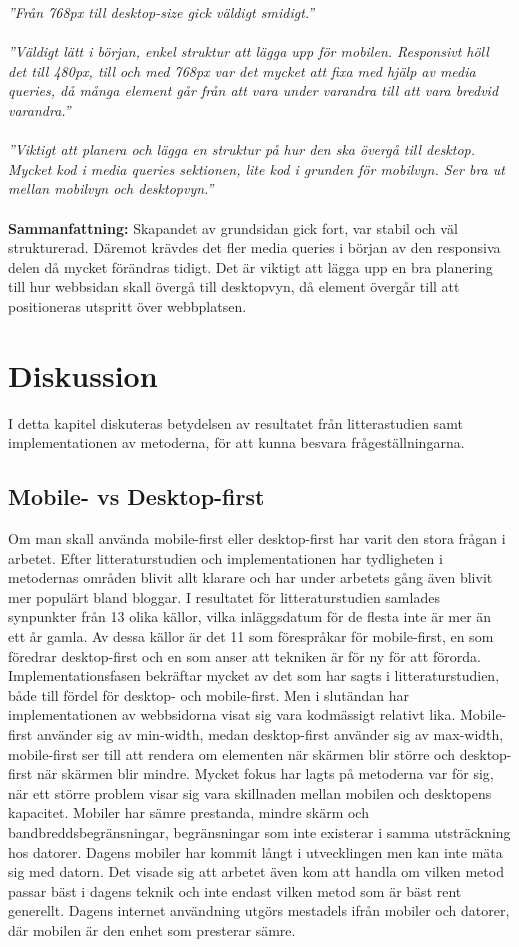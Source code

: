 \documentclass[11pt]{article}
\begin{document}
\textit{”Från 768px till desktop-size gick väldigt smidigt.”}\\\\
\textit{”Väldigt lätt i början, enkel struktur att lägga upp för mobilen. Responsivt höll det till 480px, till och med 768px var det mycket att fixa med hjälp av media queries, då många element går från att vara under varandra till att vara bredvid varandra.”}\\\\
\textit{”Viktigt att planera och lägga en struktur på hur den ska övergå till desktop. Mycket kod i media queries sektionen, lite kod i grunden för mobilvyn.  Ser bra ut mellan mobilvyn och desktopvyn.”}\\\\
\textbf{Sammanfattning:} Skapandet av grundsidan gick fort, var stabil och väl strukturerad. Däremot krävdes det fler media queries i början av den responsiva delen då mycket förändras tidigt. Det är viktigt att lägga upp en bra planering till hur webbsidan skall övergå till desktopvyn, då element övergår till att positioneras utspritt över webbplatsen.



\section{Diskussion}
I detta kapitel diskuteras betydelsen av resultatet från litterastudien samt implementationen av metoderna, för att kunna besvara frågeställningarna.
\subsection{Mobile- vs Desktop-first}
Om man skall använda mobile-first eller desktop-first har varit den stora frågan i arbetet. Efter litteraturstudien och implementationen har tydligheten i metodernas områden blivit allt klarare och har under arbetets gång även blivit mer populärt bland bloggar. I resultatet för litteraturstudien samlades synpunkter från 13 olika källor, vilka inläggsdatum för de flesta inte är mer än ett år gamla. Av dessa källor är det 11 som förespråkar för mobile-first, en som föredrar desktop-first och en som anser att tekniken är för ny för att förorda. Implementationsfasen bekräftar mycket av det som har sagts i litteraturstudien, både till fördel för desktop- och mobile-first. Men i slutändan har implementationen av webbsidorna visat sig vara kodmässigt relativt lika. Mobile-first använder sig av min-width, medan desktop-first använder sig av max-width, mobile-first ser till att rendera om elementen när skärmen blir större och desktop-first när skärmen blir mindre.
Mycket fokus har lagts på metoderna var för sig, när ett större problem visar sig vara skillnaden mellan mobilen och desktopens kapacitet. Mobiler har sämre prestanda, mindre skärm och bandbreddsbegränsningar, begränsningar som inte existerar i samma utsträckning hos datorer. Dagens mobiler har kommit långt i utvecklingen men kan inte mäta sig med datorn. Det visade sig att arbetet även kom att handla om vilken metod passar bäst i dagens teknik och inte endast vilken metod som är bäst rent generellt. Dagens internet användning utgörs mestadels ifrån mobiler och datorer, där mobilen är den enhet som presterar sämre. 
\end{document}
